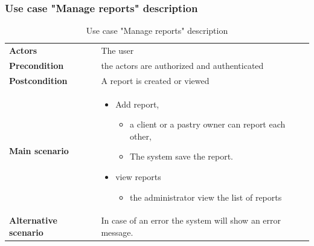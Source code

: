 \documentclass[12pt,a4paper]{report}
\begin{document}
	\subsubsection*{Use case "Manage reports" description}
		\begin{table}[H]
		\begin{center}
			\captionsetup[table]{skip=10pt}
			\caption{Use case "Manage reports" description}
			\setlength\doublerulesep{0.5pt}
			\begin{tabular}{|  p{5cm}|  p{9cm}|}
				\rowcolor{LightCyan}
				
				\hline
				\multicolumn{2}{c}{Use case "Manage reports"}\\
				\hline
				
				\textbf{Actors} &                        
				The user
				\\ \hline
				
				\textbf{Precondition} &                        
				the actors are authorized and authenticated
				\\ \hline
				\textbf{Postcondition} &                        
				A report is created or viewed
				\\ \hline
				
				\textbf{Main scenario} &                        
				\begin{itemize}
					\item Add report,
					\begin{itemize}
						\item a client or a pastry owner can report each other,
						\item The system save the report.
					\end{itemize}
					\item view reports
					
					\begin{itemize}
						\item the administrator view the list of reports
					\end{itemize}
				\end{itemize}
				\\ \hline
				
				\textbf{Alternative scenario} &                        
				In case of an error the system will show an error message.
				\\ \hline
				
				
			\end{tabular}
			
		\end{center}
		
	\end{table}
\end{document}
